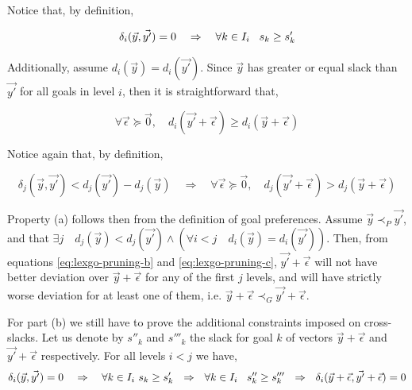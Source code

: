 \begin{demo}
Notice that, by definition,

\begin{equation}
\delta_i(\vec y, \vec{y'}) = 0 \quad \Rightarrow \quad \forall k \in I_i \hspace{3mm} s_k \geq s'_k
\label{eq:lexgo-pruning-a}
\end{equation}

Additionally, assume $d_i(\vec y) = d_i(\vec{y'})$. Since $\vec y$ has greater or equal slack than $\vec{y'}$ for all goals in level $i$, then it is straightforward that,

\begin{equation}
\forall \vec{\epsilon} \succeq \vec{0}, \quad d_i(\vec{y'} + \vec{\epsilon}) \geq  d_i(\vec{y} + \vec{\epsilon})
\label{eq:lexgo-pruning-b}
\end{equation}

Notice again that, by definition, 

\begin{equation}
\delta_j(\vec y, \vec{y'}) < d_j(\vec{y'}) - d_j(\vec{y}) \quad \Rightarrow \quad \forall \vec{\epsilon} \succeq \vec{0}, \quad d_j(\vec{y'} + \vec{\epsilon}) >  d_j(\vec{y} + \vec{\epsilon})
\label{eq:lexgo-pruning-c}
\end{equation}

Property (a) follows then from the definition of goal preferences. Assume $\vec{y} \prec_{P} \vec{y'}$, and that $\exists j \quad d_j(\vec y) < d_j(\vec{y'}) \land (\forall i < j \quad d_i(\vec y) = d_i(\vec{y'}))$. 
Then, from equations \ref{eq:lexgo-pruning-b} and \ref{eq:lexgo-pruning-c}, $\vec{y'} + \vec{\epsilon}$  will not have better deviation over $\vec{y} + \vec{\epsilon}$ for any of the first $j$ levels, and will have strictly worse deviation for at least one of them, i.e. $\vec{y} + \vec{\epsilon} \prec_{G} \vec{y'} + \vec{\epsilon}$.

For part (b) we still have to prove the additional constraints imposed on cross-slacks. Let us denote by $s''_k$ and $s'''_k$ the slack for goal $k$ of vectors $\vec{y} + \vec{\epsilon}$ and $\vec{y'} + \vec{\epsilon}$ respectively. For all levels $i<j$ we have,
\begin{align*}
\delta_i(\vec y, \vec{y'}) = 0 \quad \Rightarrow \quad \forall k \in I_i \ s_k \geq s'_k \ \ \Rightarrow \ \ \forall k \in I_i \hspace{3mm} s''_k \geq s'''_k \ \ \Rightarrow \ \ \delta_i(\vec y + \vec{\epsilon}, \vec{y'}+ \vec{\epsilon}) = 0
\label{eq:lexgo-pruning-f}
\end{align*}


\end{demo}
